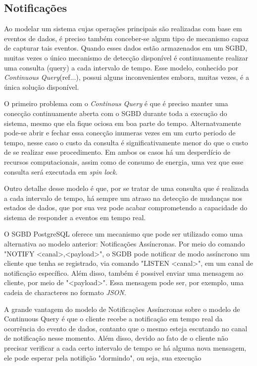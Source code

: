 \documentclass[conference]{IEEEtran}
\begin{document}
\subsection{Notificações}
Ao modelar um sistema cujas operações principais são realizadas com base em eventos de dados, é preciso também conceber-se
algum tipo de mecanismo capaz de capturar tais eventos. Quando esses dados estão armazenados em um SGBD, muitas vezes o
único mecanismo de detecção disponível é continuamente realizar uma consulta (query) a cada intervalo de tempo. Esse modelo,
conhecido por \emph{Continuous Query}(ref...), possui alguns inconvenientes embora, muitas vezes, é a única solução disponível.
\par O primeiro problema com o \emph{Continous Query} é que é preciso manter uma conecção continuamente aberta com
o SGBD durante toda a execução do sistema, mesmo que ela fique ociosa em boa parte do tempo. Alternatvamente pode-se abrir e fechar essa conecção 
inumeras vezes em um curto periodo de tempo, nesse caso o custo da consulta é significativamente menor do que o custo de
se realizar esse procedimento. Em ambos os casos há um desperdício de recursos computacionais, assim como de consumo de energia, uma
vez que esse consulta será executada em \emph{spin lock}.
\par Outro detalhe desse modelo é que, por se tratar de uma consulta que é realizada a cada intervalo de tempo, há sempre um
atraso na detecção de mudanças nos estados de dados, que por sua vez pode acabar comprometendo a capacidade do sistema
de responder a eventos em tempo real.
\par O SGBD PostgreSQL oferece um mecanismo que pode ser utilizado como uma alternativa ao modelo anterior: Notificações Assíncronas.
Por meio do comando "NOTIFY <canal>,<payload>", o SGDB pode notificar de modo assíncrono um cliente que tenha se registrado, via comando "LISTEN <canal>", 
em um canal de notificação específico. Além disso, também é possivel enviar uma mensagem ao cliente, por meio de "<payload>". Essa mensagem pode
ser, por exemplo, uma cadeia de characteres no formato \emph{JSON}.
\par A grande vantagem do modelo de Notificações Assíncronas sobre o modelo de Continuous Query é que o cliente recebe a notificação em tempo real
da ocorrência do evento de dados, contanto que o mesmo esteja escutando no canal de notificação nesse momento. Além disso, devido ao fato de o cliente
não precisar verificar a cada certo intervalo de tempo se há alguma nova mensagem, ele pode esperar pela notifição "dormindo", ou seja, sua execução
\end{document}
